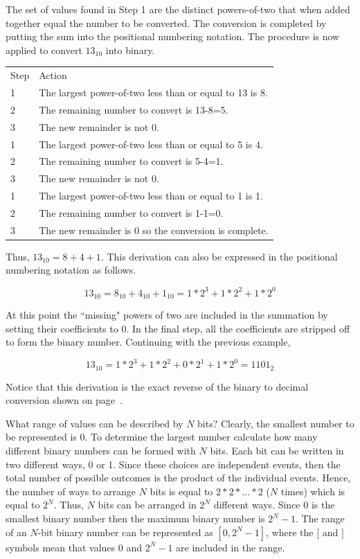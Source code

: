 The set of values found in Step 1 are the distinct powers-of-two that
when added together equal the number to be converted.  The conversion
is completed by putting the sum into the positional numbering notation.
The procedure is now applied to convert $13_{10}$ into binary.

\begin{tabular}{ll}
    Step & Action \\
    1 & The largest power-of-two less than or equal to 13 is 8. \\
    2 & The remaining number to convert is 13-8=5. \\
    3 & The new remainder is not 0. \\
    1 & The largest power-of-two less than or equal to 5 is 4. \\
    2 & The remaining number to convert is 5-4=1. \\
    3 & The new remainder is not 0. \\
    1 & The largest power-of-two less than or equal to 1 is 1. \\
    2 & The remaining number to convert is 1-1=0. \\
    3 & The new remainder is 0 so the conversion is complete. \\
\end{tabular}

Thus, $13_{10} = 8+4+1$.  This derivation can also be expressed in the
positional numbering notation as follows.

$$13_{10} = 8_{10} + 4_{10} + 1_{10} = 1*2^3 + 1*2^2 + 1*2^0 $$

At this point the ``missing" powers of two are included in the
summation by setting their coefficients to 0.  In the final step, all
the coefficients are stripped off to form the binary number.  Continuing
with the previous example,

$$13_{10} = 1*2^3 + 1*2^2 + 0*2^1 + 1*2^0 = 1101_2$$

Notice that this derivation is the exact reverse of the binary to
decimal conversion shown on page~\pageref{page:bin2dec}.

\label{page:two-to-N}
What range of values can be described by $N$ bits?  Clearly, the smallest
number to be represented is 0.  To determine the largest number
calculate how many different binary numbers can be formed with $N$ bits.
Each bit can be written in two different ways, 0 or 1. Since these choices
are independent events, then the total number of
possible outcomes is the product of the individual events.  Hence, the
number of ways to arrange $N$ bits is equal to $2*2* \ldots *2$ ($N$ times)
which is equal to $2^N$.  Thus, $N$ bits can be arranged in $2^N$ different
ways. Since 0 is the smallest binary number then the maximum binary number
is $2^N-1$.  The range of an $N$-bit binary number can be represented
as $[0,2^{N}-1]$, where the $[$ and $]$ symbols mean that values 0 and
$2^{N}-1$ are included in the range.

